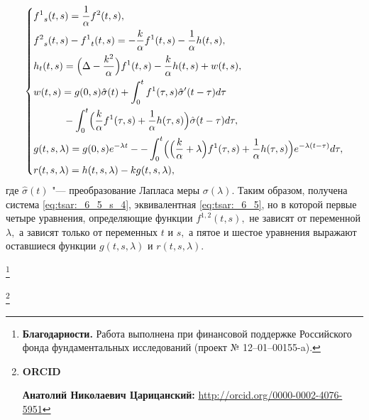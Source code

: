 \begin{equation}
\left\{
\begin{aligned}
&{f^1}_s(t,s) = \frac{1}{\alpha} {f^2}(t,s),\\
&{f^2}_s(t,s) - {f^1}_t(t,s) = - \frac{k}{\alpha} {f^1}(t,s)
			       - \frac{1}{\alpha} h(t,s)
,\\
&h_t(t,s) = \Bigl( \Delta - \frac{k^2}{\alpha} \Bigr) {f^1}(t,s)
	    - \frac{k}{\alpha} h(t,s)
	    + w(t,s)
,\\
&w(t,s) = 
g(0,s) \hat{\sigma} (t)
+ \int_0^t {f^1}(\tau,s)  {\hat{\sigma}}' (t - \tau) d\tau
\\&
\quad \qquad - \int_0^t \Bigl( \frac{k}{\alpha} {f^1}(\tau,s) + \frac{1}{\alpha} h(\tau,s) \Bigr) \hat{\sigma} (t - \tau) d\tau
, \\
&g(t,s,\lambda) = g(0,s) e^{-\lambda t} - %
				- \int_0^t \Bigl( \Bigl( \frac{k}{\alpha} + \lambda \Bigr) {f^1}(\tau,s) 
									+ \frac{1}{\alpha} h(\tau,s) 
						\Bigr) e^{-\lambda (t - \tau)} d\tau
,\\
&r(t,s,\lambda) = h(t,s,\lambda) - k g(t,s,\lambda)
,\\
\end{aligned}
\right. \label{eq:tsar:_6_5_s_4}
\end{equation}
где $\hat{\sigma} (t)$ "--- преобразование Лапласа меры $\sigma(\lambda).$ 
Таким образом, получена система \eqref{eq:tsar:_6_5_s_4}, эквивалентная \eqref{eq:tsar:_6_5}, но в которой 
первые четыре уравнения, определяющие функции $f^{1,2}(t,s),$ не зависят от переменной $\lambda,$ 
а зависят только от переменных $t$ и $s,$ а пятое и шестое уравнения выражают оставшиеся функции 
$g(t,s,\lambda)$ и $r(t,s,\lambda).$




\thanks{\textbf{Благодарности.} 
Работа выполнена при финансовой поддержке Российского фонда фундаментальных исследований (проект № 12–01–00155-a).
}



\thanks{{\bf ORCID}

{\bf Анатолий Николаевич Царицанский:}     \url{http://orcid.org/0000-0002-4076-5951}


}


\RusRef

